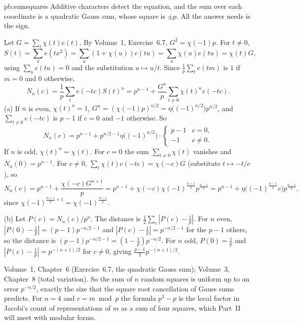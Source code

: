 \begin{solution}{pb:sumsquares}
\idea Additive characters detect the equation, and the sum over each coordinate is a quadratic Gauss sum, whose square is
$\pm p$. All the answer needs is the sign.

\writeup Let $G=\sum_t\chi(t)e(t)$. By Volume~1, Exercise~6.7, $G^2=\chi(-1)p$. For $t\ne0$,
\[
S(t)=\sum_xe(tx^2)=\sum_u(1+\chi(u))e(tu)=\sum_u\chi(u)e(tu)=\chi(t)G,
\]
using $\sum_ue(tu)=0$ and the substitution $u\mapsto u/t$. Since $\frac1p\sum_te(tm)$ is $1$ if $m=0$ and $0$ otherwise,
\[
N_n(c)=\frac1p\sum_{t}e(-tc)S(t)^n=p^{n-1}+\frac{G^n}p\sum_{t\ne0}\chi(t)^ne(-tc).
\]
(a) If $n$ is even, $\chi(t)^n=1$, $G^n=(\chi(-1)p)^{n/2}=\eta\bigl((-1)^{n/2}\bigr)p^{n/2}$, and $\sum_{t\ne0}e(-tc)$ is $p-1$ if
$c=0$ and $-1$ otherwise. So
\[
N_n(c)=p^{n-1}+p^{n/2-1}\eta\bigl((-1)^{n/2}\bigr)\cdot\begin{cases}p-1&c=0,\\-1&c\ne0.\end{cases}
\]
If $n$ is odd, $\chi(t)^n=\chi(t)$. For $c=0$ the sum $\sum_{t\ne0}\chi(t)$ vanishes and $N_n(0)=p^{n-1}$. For $c\ne0$,
$\sum_t\chi(t)e(-tc)=\chi(-c)G$ (substitute $t\mapsto-t/c$), so
\[
N_n(c)=p^{n-1}+\frac{\chi(-c)G^{n+1}}p=p^{n-1}+\chi(-c)\chi(-1)^{\frac{n+1}2}p^{\frac{n-1}2}=p^{n-1}+\eta\bigl((-1)^{\frac{n-1}2}c\bigr)p^{\frac{n-1}2},
\]
since $\chi(-1)^{\frac{n+1}2+1}=\chi(-1)^{\frac{n-1}2}$.

(b) Let $P(c)=N_n(c)/p^n$. The distance is $\frac12\sum_c|P(c)-\frac1p|$. For $n$ even, $|P(0)-\frac1p|=(p-1)p^{-n/2-1}$ and
$|P(c)-\frac1p|=p^{-n/2-1}$ for the $p-1$ others, so the distance is $(p-1)p^{-n/2-1}=(1-\frac1p)p^{-n/2}$. For $n$ odd,
$P(0)=\frac1p$ and $|P(c)-\frac1p|=p^{-(n+1)/2}$ for $c\ne0$, giving $\frac{p-1}2p^{-(n+1)/2}$.

\tools Volume~1, Chapter~6 (Exercise~6.7, the quadratic Gauss sum); Volume~3, Chapter~8 (total variation).
\leads So the sum of $n$ random squares is uniform up to an error $p^{-n/2}$, exactly the size that the square root
cancellation of Gauss sums predicts. For $n=4$ and $c=m\bmod p$ the formula $p^3-p$ is the local factor in Jacobi's count of
representations of $m$ as a sum of four squares, which Part~II will meet with modular forms.
\end{solution}

